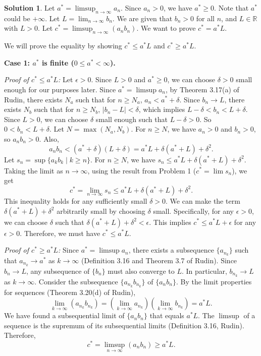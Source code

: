 \documentclass[12pt,oneside]{article}
\theoremstyle{definition}
\newtheorem*{solution}{Solution} %
\begin{document}
\begin{solution}
Let $a^* = \limsup_{n\rightarrow \infty} a_n$. Since $a_n > 0$, we have $a^* \ge 0$. Note that $a^*$ could be $+\infty$.
Let $L = \lim_{n\rightarrow \infty} b_n$. We are given that $b_n > 0$ for all $n$, and $L \in \mathbb{R}$ with $L > 0$.
Let $c^* = \limsup_{n\rightarrow \infty} (a_n b_n)$. We want to prove $c^* = a^* L$.

We will prove the equality by showing $c^* \le a^* L$ and $c^* \ge a^* L$.

\textbf{Case 1: $a^*$ is finite ($0 \le a^* < \infty$).}

\textit{Proof of $c^* \le a^* L$:}
Let $\epsilon > 0$. Since $L > 0$ and $a^* \ge 0$, we can choose $\delta > 0$ small enough for our purposes later.
Since $a^* = \limsup a_n$, by Theorem 3.17(a) of Rudin, there exists $N_a$ such that for $n \ge N_a$, $a_n < a^* + \delta$.
Since $b_n \to L$, there exists $N_b$ such that for $n \ge N_b$, $|b_n - L| < \delta$, which implies $L - \delta < b_n < L + \delta$. Since $L>0$, we can choose $\delta$ small enough such that $L-\delta > 0$. So $0 < b_n < L + \delta$.
Let $N = \max(N_a, N_b)$. For $n \ge N$, we have $a_n > 0$ and $b_n > 0$, so $a_n b_n > 0$. Also,
\[ a_n b_n < (a^* + \delta)(L + \delta) = a^* L + \delta(a^* + L) + \delta^2. \]
Let $s_n = \sup\{a_k b_k \mid k \ge n\}$. For $n \ge N$, we have $s_n \le a^* L + \delta(a^* + L) + \delta^2$.
Taking the limit as $n \to \infty$, using the result from Problem 1 ($c^* = \lim s_n$), we get
\[ c^* = \lim_{n\to\infty} s_n \le a^* L + \delta(a^* + L) + \delta^2. \]
This inequality holds for any sufficiently small $\delta > 0$. We can make the term $\delta(a^* + L) + \delta^2$ arbitrarily small by choosing $\delta$ small. Specifically, for any $\epsilon > 0$, we can choose $\delta$ such that $\delta(a^* + L) + \delta^2 < \epsilon$.
This implies $c^* \le a^* L + \epsilon$ for any $\epsilon > 0$. Therefore, we must have $c^* \le a^* L$.

\textit{Proof of $c^* \ge a^* L$:}
Since $a^* = \limsup a_n$, there exists a subsequence $\{a_{n_k}\}$ such that $a_{n_k} \to a^*$ as $k \to \infty$ (Definition 3.16 and Theorem 3.7 of Rudin).
Since $b_n \to L$, any subsequence of $\{b_n\}$ must also converge to $L$. In particular, $b_{n_k} \to L$ as $k \to \infty$.
Consider the subsequence $\{a_{n_k} b_{n_k}\}$ of $\{a_n b_n\}$. By the limit properties for sequences (Theorem 3.20(d) of Rudin),
\[ \lim_{k\to\infty} (a_{n_k} b_{n_k}) = (\lim_{k\to\infty} a_{n_k}) (\lim_{k\to\infty} b_{n_k}) = a^* L. \]
We have found a subsequential limit of $\{a_n b_n\}$ that equals $a^* L$.
The $\limsup$ of a sequence is the supremum of its subsequential limits (Definition 3.16, Rudin). Therefore,
\[ c^* = \limsup_{n\rightarrow \infty} (a_n b_n) \ge a^* L. \]


\end{solution}
\end{document}
